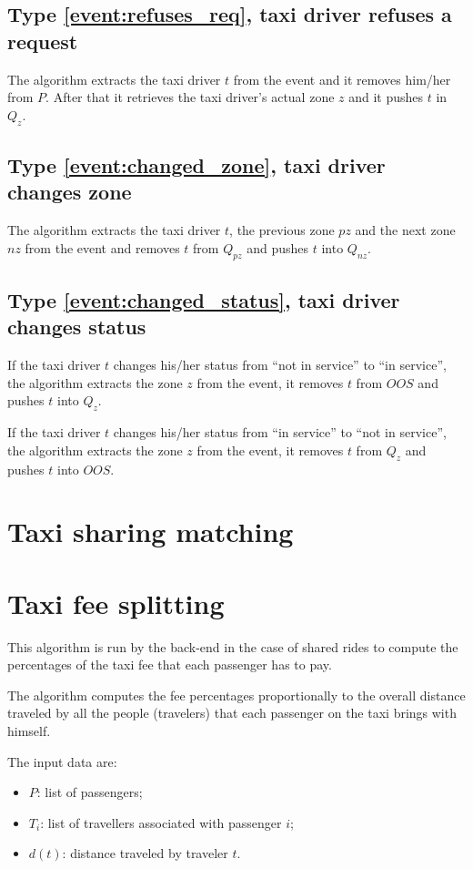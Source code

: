\subsection{Type \ref{event:refuses_req}, taxi driver refuses a request}
The algorithm extracts the taxi driver $t$ from the event and it removes him/her from $P$. After that it retrieves the taxi driver's actual zone $z$ and it pushes $t$ in $Q_z$.

\subsection{Type \ref{event:changed_zone}, taxi driver changes zone}
The algorithm extracts the taxi driver $t$, the previous zone $pz$ and the next zone $nz$ from the event and removes $t$ from $Q_{pz}$ and pushes $t$ into $Q_{nz}$.

\subsection{Type \ref{event:changed_status}, taxi driver changes status}
If the taxi driver $t$ changes his/her status from “not in service” to “in service”, the algorithm extracts the zone $z$ from the event, it removes $t$ from $OOS$ and pushes $t$ into $Q_z$.

If the taxi driver $t$ changes his/her status from “in service” to “not in service”, the algorithm extracts the zone $z$ from the event, it removes $t$ from $Q_z$ and pushes $t$ into $OOS$.


\section{Taxi sharing matching}

\section{Taxi fee splitting}
This algorithm is run by the back-end in the case of shared rides to compute the percentages of the taxi fee that each passenger has to pay.

The algorithm computes the fee percentages proportionally to the overall distance traveled by all the people (travelers) that each passenger on the taxi brings with himself.

The input data are:
\begin{itemize}
    \item $P$: list of passengers;
    \item $T_i$: list of travellers associated with passenger $i$;
    \item $d(t)$: distance traveled by traveler $t$.
\end{itemize}

